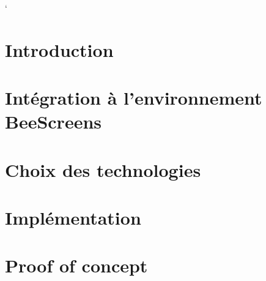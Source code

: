 \documentclass[
    iict, %
    il, %
]{heig-tb}
\begin{document}
\maketitle
\frontmatter
\clearemptydoublepage

\lstMakeShortInline`

\preamble
\authentification

%   

\clearemptydoublepage
{
  \tableofcontents
  \let\cleardoublepage\clearpage
  \listoffigures
  \let\cleardoublepage\clearpage
  \listoftables
  \let\cleardoublepage\clearpage
  \listoflistings
}

\printnomenclature
\clearemptydoublepage
{}

\mainmatter
\chapter{Introduction}


\chapter{Intégration à l'environnement BeeScreens}


\chapter{Choix des technologies}


% 

\chapter{Implémentation}
\label{implementation}


\chapter{Proof of concept}

\end{document}
